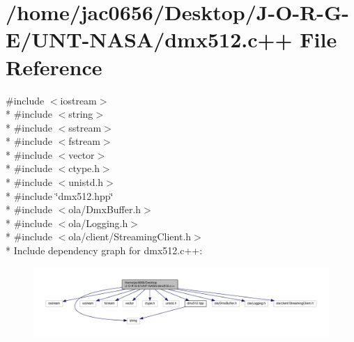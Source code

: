 \hypertarget{dmx512_8c_09_09}{}\section{/home/jac0656/\+Desktop/\+J-\/\+O-\/\+R-\/\+G-\/\+E/\+U\+N\+T-\/\+N\+A\+S\+A/dmx512.c++ File Reference}
\label{dmx512_8c_09_09}
{\ttfamily \#include $<$iostream$>$}\\*
{\ttfamily \#include $<$string$>$}\\*
{\ttfamily \#include $<$sstream$>$}\\*
{\ttfamily \#include $<$fstream$>$}\\*
{\ttfamily \#include $<$vector$>$}\\*
{\ttfamily \#include $<$ctype.\+h$>$}\\*
{\ttfamily \#include $<$unistd.\+h$>$}\\*
{\ttfamily \#include \char`\"{}dmx512.\+hpp\char`\"{}}\\*
{\ttfamily \#include $<$ola/\+Dmx\+Buffer.\+h$>$}\\*
{\ttfamily \#include $<$ola/\+Logging.\+h$>$}\\*
{\ttfamily \#include $<$ola/client/\+Streaming\+Client.\+h$>$}\\*
Include dependency graph for dmx512.\+c++\+:
\nopagebreak
\begin{figure}[H]
\begin{center}
\leavevmode
\includegraphics[width=350pt]{dmx512_8c_09_09__incl}
\end{center}
\end{figure}
